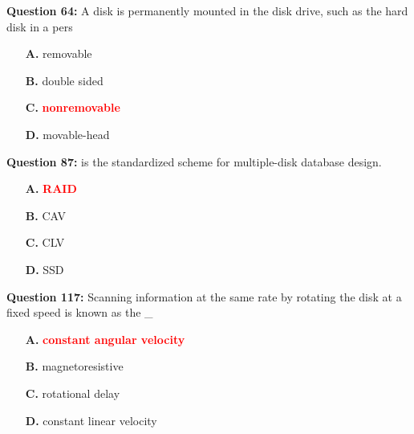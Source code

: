 \documentclass[12pt,a4paper]{article}
\begin{document}
\vspace{0.5cm}

\vspace{0.5cm}

\textbf{Question 64:} A \underline{\hspace{1.5cm}} disk is permanently mounted in the disk drive, such as the hard disk in a pers

\begin{itemize}
    \item[\textbf{A.}] removable
    \item[\textbf{B.}] double sided
    \item[\textbf{C.}] \textcolor{red}{\textbf{nonremovable}}
    \item[\textbf{D.}] movable-head
\end{itemize}

\vspace{0.5cm}

\vspace{0.5cm}

\textbf{Question 87:} \underline{\hspace{1.5cm}} is the standardized scheme for multiple-disk database design.

\begin{itemize}
    \item[\textbf{A.}] \textcolor{red}{\textbf{RAID}}
    \item[\textbf{B.}] CAV
    \item[\textbf{C.}] CLV
    \item[\textbf{D.}] SSD
\end{itemize}

\vspace{0.5cm}

\vspace{0.5cm}

\textbf{Question 117:} Scanning information at the same rate by rotating the disk at a fixed speed is known as the \_

\begin{itemize}
    \item[\textbf{A.}] \textcolor{red}{\textbf{constant angular velocity}}
    \item[\textbf{B.}] magnetoresistive
    \item[\textbf{C.}] rotational delay
    \item[\textbf{D.}] constant linear velocity
\end{itemize}

\vspace{0.5cm}
\end{document}
